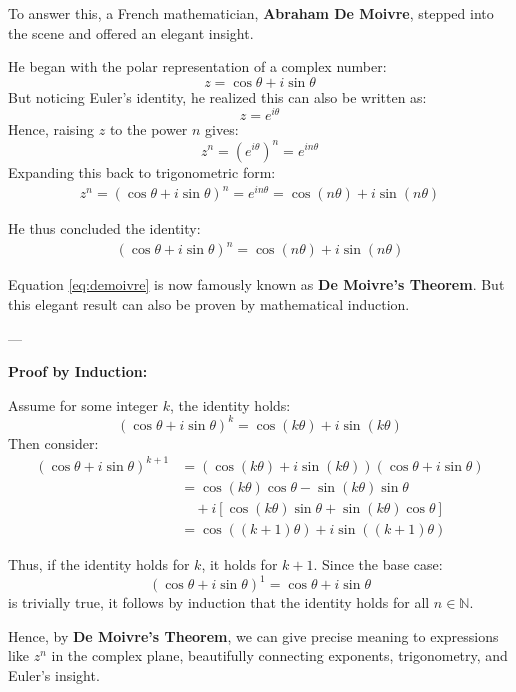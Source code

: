 To answer this, a French mathematician, \textbf{Abraham De Moivre}, stepped into the scene and offered an elegant insight.

He began with the polar representation of a complex number:
\[
z = \cos \theta + i \sin \theta
\]
But noticing Euler’s identity, he realized this can also be written as:
\[
z = e^{i\theta}
\]
Hence, raising $z$ to the power $n$ gives:
\[
z^n = \left(e^{i\theta}\right)^n = e^{i n\theta}
\]
Expanding this back to trigonometric form:
\begin{align*}
z^n = (\cos \theta + i \sin \theta)^n = e^{i n\theta} = \cos(n\theta) + i \sin(n\theta)
\end{align*}

He thus concluded the identity:
\begin{align}
(\cos \theta + i \sin \theta)^n = \cos(n\theta) + i \sin(n\theta)
\label{eq:demoivre}
\end{align}

Equation \eqref{eq:demoivre} is now famously known as \textbf{De Moivre's Theorem}.  
But this elegant result can also be proven by mathematical induction.

---

\textbf{Proof by Induction:}

Assume for some integer $k$, the identity holds:
\[
(\cos \theta + i \sin \theta)^k = \cos(k\theta) + i \sin(k\theta)
\]
Then consider:
\begin{align*}
(\cos \theta + i \sin \theta)^{k+1} 
&= (\cos(k\theta) + i \sin(k\theta))(\cos \theta + i \sin \theta) \\
&= \cos(k\theta)\cos\theta - \sin(k\theta)\sin\theta \\
&\quad + i[\cos(k\theta)\sin\theta + \sin(k\theta)\cos\theta] \\
&= \cos((k+1)\theta) + i \sin((k+1)\theta)
\end{align*}

Thus, if the identity holds for $k$, it holds for $k+1$.  
Since the base case:
\[
(\cos \theta + i \sin \theta)^1 = \cos \theta + i \sin \theta
\]
is trivially true, it follows by induction that the identity holds for all $n \in \mathbb{N}$.

Hence, by \textbf{De Moivre’s Theorem}, we can give precise meaning to expressions like $z^n$ in the complex plane, beautifully connecting exponents, trigonometry, and Euler’s insight.
